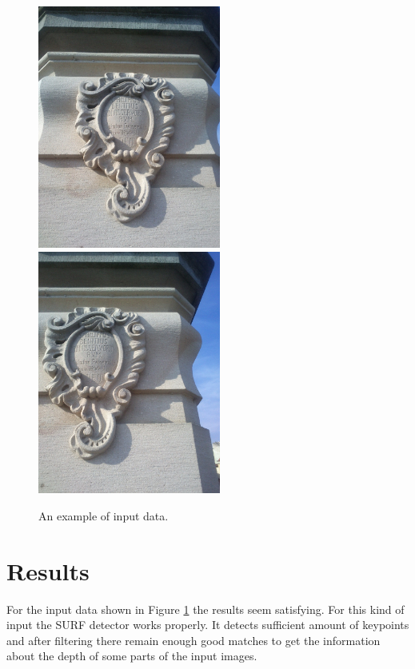 \begin{figure}[h]
\centerline{
\includegraphics[width=6.0cm]{img/memorial_a.png}
\includegraphics[width=6.0cm]{img/memorial_b.png}}

\caption{An example of input data.}
\label{fig:input_samples}
\end{figure}





\section{Results}
For the input data shown in Figure \ref{fig:input_samples} the results seem satisfying.
For this kind of input the SURF detector works properly.
It detects sufficient amount of keypoints and after filtering there remain enough good matches to get the information about the depth of some parts of the input images.

